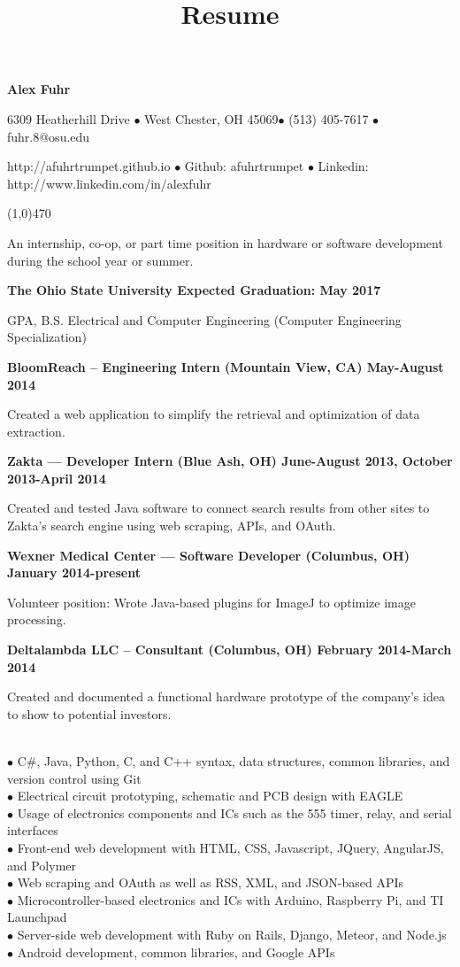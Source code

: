 \documentclass[10pt]{article}
\title{Resume}
\begin{document}
\centerline{{\LARGE \bf Alex Fuhr}}
\centerline{6309 Heatherhill Drive $\bullet$ West Chester, OH 45069$\bullet$ (513) 405-7617 $\bullet$ fuhr.8@osu.edu}
\centerline{http://afuhrtrumpet.github.io $\bullet$ Github: afuhrtrumpet $\bullet$ Linkedin: http://www.linkedin.com/in/alexfuhr}
\noindent
\line(1,0){470}\\

\smallskip

\noindent
An internship, co-op, or part time position in hardware or software development during the school year or summer.
\medskip

\smallskip

\centerline{{\large \bf The Ohio State University \hfill Expected Graduation: May 2017}}
 GPA, B.S. Electrical and Computer Engineering (Computer Engineering Specialization)
\medskip

\smallskip

\centerline{{\large \bf BloomReach -- Engineering Intern (Mountain View, CA) \hfill May-August 2014}}
\noindent
Created a web application to simplify the retrieval and optimization of data extraction.
\smallskip

\centerline{{\large \bf Zakta --- Developer Intern (Blue Ash, OH) \hfill June-August 2013, October 2013-April 2014}}
\noindent
Created and tested Java software to connect search results from other sites to Zakta's search engine using web scraping, APIs, and OAuth.
\smallskip

\centerline{{\large \bf Wexner Medical Center --- Software Developer (Columbus, OH) \hfill January 2014-present}}
\noindent
Volunteer position: Wrote Java-based plugins for ImageJ to optimize image processing.
\smallskip

\centerline{{\large \bf Deltalambda LLC -- Consultant (Columbus, OH) \hfill February 2014-March 2014}}
\noindent
Created and documented a functional hardware prototype of the company's idea to show to potential investors.
\medskip

\\
$\bullet$ C\#, Java, Python, C, and C++ syntax, data structures, common libraries, and version control using Git\\
$\bullet$ Electrical circuit prototyping, schematic and PCB design with EAGLE\\
$\bullet$ Usage of electronics components and ICs such as the 555 timer, relay, and serial interfaces\\
$\bullet$ Front-end web development with HTML, CSS, Javascript, JQuery, AngularJS, and Polymer\\
$\bullet$ Web scraping and OAuth as well as RSS, XML, and JSON-based APIs\\
$\bullet$ Microcontroller-based electronics and ICs with Arduino, Raspberry Pi, and TI Launchpad\\
$\bullet$ Server-side web development with Ruby on Rails, Django, Meteor, and Node.js\\
$\bullet$ Android development, common libraries, and Google APIs
\medskip
\end{document}
